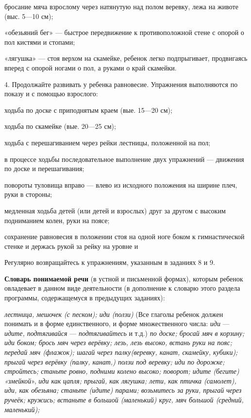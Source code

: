 \documentclass{book}
\renewcommand{\emph}[1]{\textit{#1}}
\begin{document}
бросание мяча взрослому через натянутую над полом веревку, лежа на
животе (выс. 5---10 см);

«обезьяний бег» --- быстрое передвижение к противоположной стене с
опорой о пол кистями и стопами;

«лягушка» --- стоя верхом на скамейке, ребенок легко подпрыгивает,
продвигаясь вперед с опорой ногами о пол, а руками о край скамейки.

4. Продолжайте развивать у ребенка равновесие. Упражнения выполняются по
показу и с помощью взрослого:

ходьба по доске с приподнятым краем (вые. 15---20 см);

ходьба по скамейке (вые. 20---25 см);

ходьба с перешагиванием через рейки лестницы, положенной на пол;

в процессе ходьбы последовательное выполнение двух упражнений ---
движения по доске и перешагивания;

повороты туловища вправо --- влево из исходного положения на ширине
плеч, руки в стороны;

медленная ходьба детей (или детей и взрослых) друг за другом с высоким
подниманием колен, руки на поясе;

сохранение равновесия в положении стоя на одной ноге боком к
гимнастической стенке и держась рукой за рейку на уровне и

Регулярно возвращайтесь к упражнениям, указанным в заданиях 8 и 9.

\textbf{Словарь понимаемой речи} (в устной и письменной формах), которым
ребенок овладевает в данном виде деятельности (в дополнение к словарю
этого раздела программы, содержащемуся в предыдущих заданиях):

\emph{лестница, мешочек (с песком); иди (ползи)} (Все глаголы ребенок
должен понимать и в форме единственного, и форме множественного числа:
\emph{иди} --- \emph{идите, подтягивайся} --- \emph{подтягивайтесь} и
т.д.) \emph{по доске; бросай мяч} \emph{в корзину; иди боком; брось мяч
через верёвку; лезь, лезь высоко,} \emph{встань руки на пояс; передай
мяч (флажок); шагай через палку(веревку, канат, скамейку, кубики);
прыгай через верёвку (палку, канат,) ползи под веревку; иди по дорожке;
стройтесь; станьте ровно, подними колено высоко; поворот; идите (бегите)
«змейкой}», \emph{иди как} \emph{цапля; прыгай, как лягушка; лети, как
птичка (самолет), иди, как обезьяна; станьте (идите) парами; возьмитесь
за руки, прыгай} \emph{через ручеёк; кружись; встаньте в большой
(маленький) круг, мяч большой (средний, маленький);}
\end{document}
